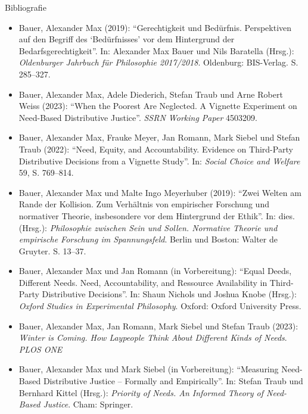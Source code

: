 \documentclass[xcolor=table,9pt,aspectratio=169]{beamer}
\begin{document}
\begin{frame}{\vspace*{10mm}Bibliografie}
\vspace*{-4mm}
{\footnotesize
\begin{itemize}[label=,leftmargin=2em,itemindent=-2em]
   \item Bauer, Alexander Max (2019): \enquote{Gerechtigkeit und Bedürfnis. Perspektiven auf den Begriff des \enquote{Bedürfnisses} vor dem Hintergrund der Bedarfsgerechtigkeit}. In: Alexander Max Bauer und Nils Baratella (Hrsg.): \textit{Oldenburger Jahrbuch für Philosophie 2017/2018}. Oldenburg: BIS-Verlag. S. 285--327.
   \item Bauer, Alexander Max, Adele Diederich, Stefan Traub und Arne Robert Weiss (2023): \enquote{When the Poorest Are Neglected. A Vignette Experiment on Need-Based Distributive Justice}. \textit{SSRN Working Paper} 4503209.
   \item Bauer, Alexander Max, Frauke Meyer, Jan Romann, Mark Siebel und Stefan Traub (2022): \enquote{Need, Equity, and Accountability. Evidence on Third-Party Distributive Decisions from a Vignette Study}. In: \textit{Social Choice and Welfare} 59, S. 769--814.
   \item Bauer, Alexander Max und Malte Ingo Meyerhuber (2019): \enquote{Zwei Welten am Rande der Kollision. Zum Verhältnis von empirischer Forschung und normativer Theorie, insbesondere vor dem Hintergrund der Ethik}. In: dies. (Hrsg.): \textit{Philosophie zwischen Sein und Sollen. Normative Theorie und empirische Forschung im Spannungsfeld}. Berlin und Boston: Walter de Gruyter. S. 13--37.
   \item Bauer, Alexander Max und Jan Romann (in Vorbereitung): \enquote{Equal Deeds, Different Needs. Need, Accountability, and Ressource Availability in Third-Party Distributive Decisions}. In: Shaun Nichols und Joshua Knobe (Hrsg.): \textit{Oxford Studies in Experimental Philosophy}. Oxford: Oxford University Press.
   \item Bauer, Alexander Max, Jan Romann, Mark Siebel und Stefan Traub (2023): \textit{Winter is Coming. How Laypeople Think About Different Kinds of Needs}. \textit{PLOS ONE}
   \item Bauer, Alexander Max und Mark Siebel (in Vorbereitung): \enquote{Measuring Need-Based Distributive Justice -- Formally and Empirically}. In: Stefan Traub und Bernhard Kittel (Hrsg.): \textit{Priority of Needs. An Informed Theory of Need-Based Justice}. Cham: Springer.
\end{itemize}
}
\end{frame}
\end{document}
